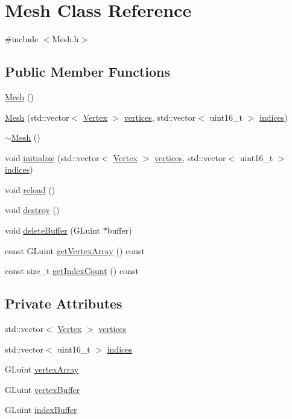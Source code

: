 \hypertarget{class_mesh}{}\section{Mesh Class Reference}
\label{class_mesh}


{\ttfamily \#include $<$Mesh.\+h$>$}

\subsection*{Public Member Functions}
\begin{DoxyCompactItemize}
\item 
\hyperlink{class_mesh_a2af137f1571af89172b9c102302c416b}{Mesh} ()
\item 
\hyperlink{class_mesh_a64cf0a605d5513269cf9135cd5dc12d8}{Mesh} (std\+::vector$<$ \hyperlink{struct_vertex}{Vertex} $>$ \hyperlink{class_mesh_a6465a888c97232a39e12aad008c969c3}{vertices}, std\+::vector$<$ uint16\+\_\+t $>$ \hyperlink{class_mesh_a36a2f9ff21b740b317dadd2f890489c5}{indices})
\item 
\hyperlink{class_mesh_a5efe4da1a4c0971cfb037bd70304c303}{$\sim$\+Mesh} ()
\item 
void \hyperlink{class_mesh_a57c92bc4696d2021fd27d2d97160e4d0}{initialize} (std\+::vector$<$ \hyperlink{struct_vertex}{Vertex} $>$ \hyperlink{class_mesh_a6465a888c97232a39e12aad008c969c3}{vertices}, std\+::vector$<$ uint16\+\_\+t $>$ \hyperlink{class_mesh_a36a2f9ff21b740b317dadd2f890489c5}{indices})
\item 
void \hyperlink{class_mesh_ad331a787fe94be45d100c8cf4ca43a57}{reload} ()
\item 
void \hyperlink{class_mesh_a339f2160c7610b1106c0fd5e9c033788}{destroy} ()
\item 
void \hyperlink{class_mesh_a78f343a657c5cd0db0d8c1a7033371bf}{delete\+Buffer} (G\+Luint $\ast$buffer)
\item 
const G\+Luint \hyperlink{class_mesh_a08163c6f3f5bed272777fd180737eabd}{get\+Vertex\+Array} () const
\item 
const size\+\_\+t \hyperlink{class_mesh_ae299279000ab9c85a2e62a749f660edb}{get\+Index\+Count} () const
\end{DoxyCompactItemize}
\subsection*{Private Attributes}
\begin{DoxyCompactItemize}
\item 
std\+::vector$<$ \hyperlink{struct_vertex}{Vertex} $>$ \hyperlink{class_mesh_a6465a888c97232a39e12aad008c969c3}{vertices}
\item 
std\+::vector$<$ uint16\+\_\+t $>$ \hyperlink{class_mesh_a36a2f9ff21b740b317dadd2f890489c5}{indices}
\item 
G\+Luint \hyperlink{class_mesh_a8b16232ade5f530ce223466d007eb189}{vertex\+Array}
\item 
G\+Luint \hyperlink{class_mesh_ab929a49165b786e7c35d982713d6eca3}{vertex\+Buffer}
\item 
G\+Luint \hyperlink{class_mesh_abe7587c429d8ed1662de8796ebdaf09d}{index\+Buffer}
\end{DoxyCompactItemize}


